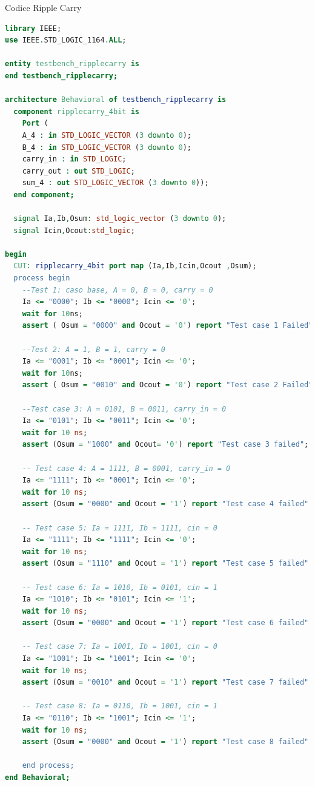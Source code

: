 \begin{problem}{Codice Ripple Carry}{}
\begin{lstlisting}[language=VHDL]
library IEEE;
use IEEE.STD_LOGIC_1164.ALL;

entity testbench_ripplecarry is
end testbench_ripplecarry;

architecture Behavioral of testbench_ripplecarry is
  component ripplecarry_4bit is
    Port ( 
    A_4 : in STD_LOGIC_VECTOR (3 downto 0);
    B_4 : in STD_LOGIC_VECTOR (3 downto 0);
    carry_in : in STD_LOGIC;
    carry_out : out STD_LOGIC;
    sum_4 : out STD_LOGIC_VECTOR (3 downto 0));
  end component;

  signal Ia,Ib,Osum: std_logic_vector (3 downto 0);
  signal Icin,Ocout:std_logic;
  
begin
  CUT: ripplecarry_4bit port map (Ia,Ib,Icin,Ocout ,Osum);
  process begin
    --Test 1: caso base, A = 0, B = 0, carry = 0
    Ia <= "0000"; Ib <= "0000"; Icin <= '0';
    wait for 10ns;
    assert ( Osum = "0000" and Ocout = '0') report "Test case 1 Failed" severity error;

    --Test 2: A = 1, B = 1, carry = 0
    Ia <= "0001"; Ib <= "0001"; Icin <= '0';
    wait for 10ns;
    assert ( Osum = "0010" and Ocout = '0') report "Test case 2 Failed" severity error;

    --Test case 3: A = 0101, B = 0011, carry_in = 0
    Ia <= "0101"; Ib <= "0011"; Icin <= '0';
    wait for 10 ns;
    assert (Osum = "1000" and Ocout= '0') report "Test case 3 failed";

    -- Test case 4: A = 1111, B = 0001, carry_in = 0
    Ia <= "1111"; Ib <= "0001"; Icin <= '0';
    wait for 10 ns;
    assert (Osum = "0000" and Ocout = '1') report "Test case 4 failed" severity error;

    -- Test case 5: Ia = 1111, Ib = 1111, cin = 0
    Ia <= "1111"; Ib <= "1111"; Icin <= '0';
    wait for 10 ns;
    assert (Osum = "1110" and Ocout = '1') report "Test case 5 failed" severity error;

    -- Test case 6: Ia = 1010, Ib = 0101, cin = 1
    Ia <= "1010"; Ib <= "0101"; Icin <= '1';
    wait for 10 ns;
    assert (Osum = "0000" and Ocout = '1') report "Test case 6 failed" severity error;

    -- Test case 7: Ia = 1001, Ib = 1001, cin = 0
    Ia <= "1001"; Ib <= "1001"; Icin <= '0';
    wait for 10 ns;
    assert (Osum = "0010" and Ocout = '1') report "Test case 7 failed" severity error;

    -- Test case 8: Ia = 0110, Ib = 1001, cin = 1
    Ia <= "0110"; Ib <= "1001"; Icin <= '1';
    wait for 10 ns;
    assert (Osum = "0000" and Ocout = '1') report "Test case 8 failed" severity error;
    
    end process;
end Behavioral;

\end{lstlisting}
\end{problem}

